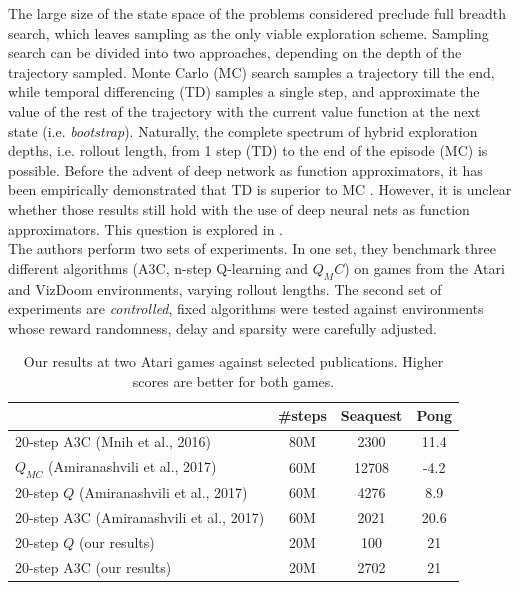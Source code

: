 \documentclass{article}
\begin{document}
The large size of the state space of the problems considered preclude full breadth
search, which leaves sampling as the only viable exploration scheme. Sampling
search can be divided into two approaches, depending on the depth of the trajectory
sampled. Monte Carlo (MC) search samples a trajectory till the end, while temporal
differencing (TD) samples a single step, and approximate the value of the rest of the
trajectory with the current value function at the next state (i.e. \emph{bootstrap}).
Naturally, the complete spectrum of hybrid exploration depths, i.e. rollout length,
from 1 step (TD) to the end of the episode (MC) is possible.
Before the advent of deep network as function approximators, it has been empirically
demonstrated that TD is superior to MC \citep{sutton1995}. However, it is unclear
whether those results still hold with the use of deep neural nets as function approximators.
This question is explored in \citep{amiranashvili2018analyzing}. \\

The authors perform two sets of experiments. In one set, they benchmark three different
algorithms (A3C, n-step Q-learning and $Q_MC$) on games from the Atari and VizDoom environments,
varying rollout lengths. The second set of experiments are \emph{controlled}, fixed algorithms
were tested against environments whose reward randomness, delay and sparsity were
carefully adjusted.\\

\begin{table}[H]
\centering
\label{table1}
    \begin{tabular}{@{}l|c|cc}
    \toprule
                                             & \#steps  & Seaquest  & Pong  \\ \midrule
    20-step A3C (Mnih et al., 2016)          & 80M      & 2300      & 11.4  \\ \midrule
    $Q_{MC}$ (Amiranashvili et al., 2017)    & 60M      & 12708     & -4.2  \\
    20-step $Q$ (Amiranashvili et al., 2017) & 60M      & 4276      & 8.9   \\
    20-step A3C (Amiranashvili et al., 2017) & 60M      & 2021      & 20.6  \\ \midrule
    20-step $Q$ (our results)                & 20M      & 100       & 21    \\
    20-step A3C (our results)                & 20M      & 2702      & 21    \\ \bottomrule
    \end{tabular}
\caption{Our results at two Atari games against selected publications. Higher scores are better for both games.}
\end{table}
\end{document}
